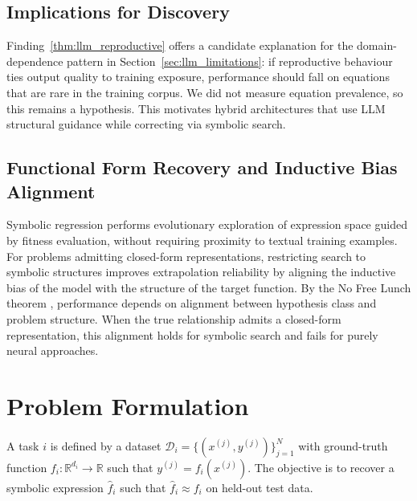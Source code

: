 \documentclass[twoside,11pt]{article}
\begin{document}
\subsection{Implications for Discovery}\label{subsec:implications-for-discovery}
\label{sec:theory_implications}

Finding~\ref{thm:llm_reproductive} offers a candidate explanation for the domain-dependence pattern in Section~\ref{sec:llm_limitations}: if reproductive behaviour ties output quality to training exposure, performance should fall on equations that are rare in the training corpus. We did not measure equation prevalence, so this remains a hypothesis. This motivates hybrid architectures that use LLM structural guidance while correcting via symbolic search.

\subsection{Functional Form Recovery and Inductive Bias Alignment}\label{subsec:functional-form-recovery-and-inductive-b}
\label{sec:theory_recovery}

Symbolic regression performs evolutionary exploration of expression space guided by fitness evaluation, without requiring proximity to textual training examples. For problems admitting closed-form representations, restricting search to symbolic structures improves extrapolation reliability by aligning the inductive bias of the model with the structure of the target function. By the No Free Lunch theorem \citep{wolpert1997no}, performance depends on alignment between hypothesis class and problem structure. When the true relationship admits a closed-form representation, this alignment holds for symbolic search and fails for purely neural approaches.

\section{Problem Formulation}
\label{sec:problem}

\begin{definition}
A task $i$ is defined by a dataset $\mathcal{D}_i = \{(x^{(j)}, y^{(j)})\}_{j=1}^{N}$
with ground-truth function $f_i: \mathbb{R}^{d_i} \to \mathbb{R}$ such that
$y^{(j)} = f_i(x^{(j)})$.  The objective is to recover a symbolic expression
$\hat{f}_i$ such that $\hat{f}_i \approx f_i$ on held-out test data.
\end{definition}
\end{document}
